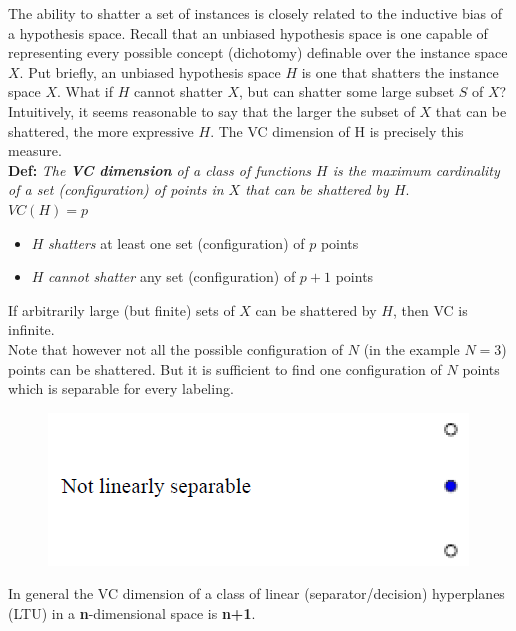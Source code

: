 \documentclass[../main.tex]{subfiles}
\begin{document}
\noindent The ability to shatter a set of instances is closely related to the inductive bias of a hypothesis space. Recall that an unbiased hypothesis space is one capable of representing every possible concept (dichotomy) definable over the instance space $X$. Put briefly, an unbiased hypothesis space $H$ is one that shatters the instance space $X$. What if $H$ cannot shatter $X$, but can shatter some large subset $S$ of $X$? Intuitively, it seems reasonable to say that the larger the subset of $X$ that can be shattered, the more expressive $H$. The VC dimension of H is precisely this measure.\\

\noindent \textbf{Def:} \emph{The \textbf{VC dimension} of a class of functions $H$ is the maximum cardinality of a set (configuration) of points in $X$ that can be shattered by $H$}.\\

\noindent$VC(H)=p$
\begin{itemize}
    \item $H$ \emph{shatters} at least one set (configuration) of $p$ points
    \item $H$ \emph{cannot shatter} any set (configuration) of $p + 1$ points
\end{itemize}
If arbitrarily large (but finite) sets of $X$ can be shattered by $H$, then VC is infinite.\\

\noindent Note that however not all the possible configuration of $N$ (in the example $N=3$) points can be shattered. But it is sufficient to find one configuration of $N$ points which is separable for every labeling.
\begin{figure}[H]
    \centering
    \includegraphics[scale = 0.4]{lectures/5_validation/5_dic_4.png}
\end{figure}
\noindent In general the VC dimension of a class of linear (separator/decision) hyperplanes (LTU) in a \textbf{n}-dimensional space is \textbf{n+1}.\\
\end{document}
